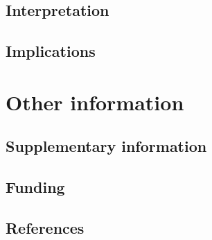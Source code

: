 \documentclass[
  letterpaper,
  DIV=11,
  numbers=noendperiod]{scrartcl}
\begin{document}
\subsection{Interpretation}\label{interpretation}

\subsection{Implications}\label{implications}

\section{Other information}\label{other-information}

\subsection{Supplementary information}\label{supplementary-information}

\subsection{Funding}\label{funding}

\subsection{References}\label{references}
\end{document}
